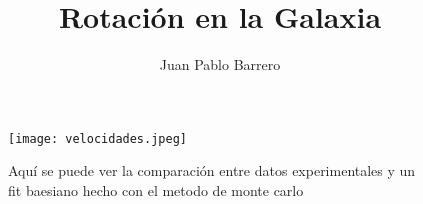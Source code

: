 \documentclass[12pt, letterpaper]{article}
\title{Rotación en la Galaxia}
\author{Juan Pablo Barrero}
\begin{document}
\begin{figure}[H] 
	\centering 
	\texttt{[image: velocidades.jpeg]} 
	\caption{Aquí se puede ver la comparación entre datos experimentales y un fit baesiano hecho con el metodo de monte carlo} 
	\label{fig:Curvas} 
\end{figure}
\end{document}

